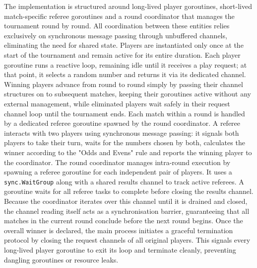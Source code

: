 \documentclass[11pt,a4paper]{article}
\begin{document}
The implementation is structured around long-lived player goroutines, short-lived match-specific referee goroutines and a round coordinator that manages the tournament round by round. All coordination between these entities relies exclusively on synchronous message passing through unbuffered channels, eliminating the need for shared state. Players are instantiated only once at the start of the tournament and remain active for its entire duration. Each player goroutine runs a reactive loop, remaining idle until it receives a play request; at that point, it selects a random number and returns it via its dedicated channel. Winning players advance from round to round simply by passing their channel structures on to subsequent matches, keeping their goroutines active without any external management, while eliminated players wait safely in their request channel loop until the tournament ends. Each match within a round is handled by a dedicated referee goroutine spawned by the round coordinator. A referee interacts with two players using synchronous message passing: it signals both players to take their turn, waits for the numbers chosen by both, calculates the winner according to the "Odds and Evens" rule and reports the winning player to the coordinator. The round coordinator manages intra-round execution by spawning a referee goroutine for each independent pair of players. It uses a \texttt{sync.WaitGroup} along with a shared results channel to track active referees. A goroutine waits for all referee tasks to complete before closing the results channel. Because the coordinator iterates over this channel until it is drained and closed, the channel reading itself acts as a synchronisation barrier, guaranteeing that all matches in the current round conclude before the next round begins. Once the overall winner is declared, the main process initiates a graceful termination protocol by closing the request channels of all original players. This signals every long-lived player goroutine to exit its loop and terminate cleanly, preventing dangling goroutines or resource leaks.
\end{document}
